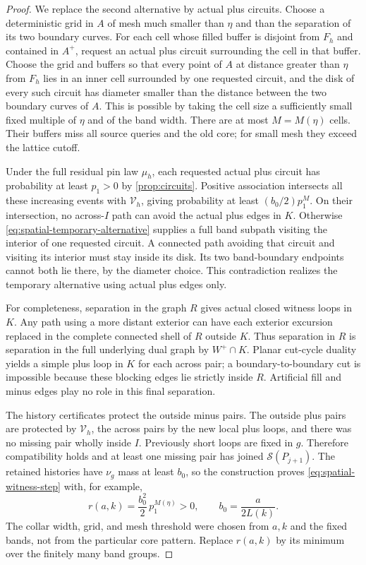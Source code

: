 \begin{proof}
We replace the second alternative by actual plus circuits. Choose
a deterministic grid in $A$ of mesh much smaller than $\eta$ and
than the separation of its two boundary curves. For each cell
whose filled buffer is disjoint from $F_h$ and contained in $A^+$,
request an actual plus circuit surrounding the cell in that buffer.
Choose the grid and buffers so that every point of $A$ at distance
greater than $\eta$ from $F_h$ lies in an inner cell surrounded by
one requested circuit, and the disk of every such circuit has diameter
smaller
than the distance between the two boundary curves of $A$. This
is possible by taking the cell size a sufficiently small fixed
multiple of $\eta$ and of the band width. There are at most
$M=M(\eta)$ cells. Their buffers miss all source queries and the
old core; for small mesh they exceed the lattice cutoff.

Under the full residual pin law $\mu_h$, each requested actual
plus circuit has probability at least $p_1>0$ by
\cref{prop:circuits}. Positive association intersects all these
increasing events with $\mathcal V_h$, giving probability at least
$(b_0/2)p_1^M$. On their intersection, no across-$I$ path can
avoid the actual plus edges in $K$. Otherwise
\eqref{eq:spatial-temporary-alternative} supplies a full band
subpath visiting the interior of one requested circuit. A connected
path avoiding that circuit and visiting its interior must stay
inside its disk. Its two band-boundary endpoints cannot both lie
there, by the diameter choice. This contradiction realizes the
temporary alternative using actual plus edges only.

For completeness, separation in the graph $R$ gives actual closed
witness loops in $K$. Any path using a more distant exterior can
have each exterior excursion replaced in the complete connected
shell of $R$ outside $K$. Thus separation in $R$ is separation in
the full underlying dual graph by $W^+\cap K$. Planar cut-cycle
duality yields a simple plus loop in $K$ for each across pair;
a boundary-to-boundary cut is impossible because these blocking
edges lie strictly inside $R$. Artificial fill and minus edges
play no role in this final separation.

The history certificates protect the outside minus pairs. The
outside plus pairs are protected by $\mathcal V_h$, the across
pairs by the new local plus loops, and there was no missing pair
wholly inside $I$. Previously short loops are fixed in $g$.
Therefore compatibility holds and at least one missing pair has
joined $\mathcal S(P_{j+1})$. The retained histories have
$\nu_g$ mass at least $b_0$, so the construction proves
\eqref{eq:spatial-witness-step} with, for example,
\[
             r(a,k)=\frac{b_0^2}{2}\,p_1^{M(\eta)}>0,
       \qquad b_0=\frac{a}{2L(k)}.
\]
The collar width, grid, and mesh threshold were chosen from
$a,k$ and the fixed bands, not from the particular core pattern.
Replace $r(a,k)$ by its minimum over the finitely many band groups.


\end{proof}
